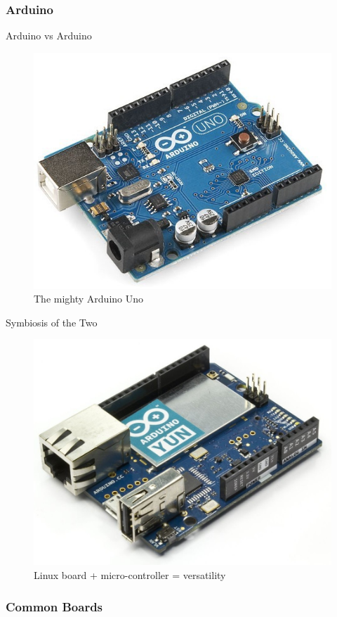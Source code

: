 \documentclass[hyperref={unicode}]{beamer}
\begin{document}
\subsubsection{Arduino}

\begin{frame}{Arduino vs Arduino}
	\begin{figure}
	\includegraphics[width=.7\textwidth]{arduino-uno.jpg}
	\caption{The mighty Arduino Uno}
	\end{figure}
\end{frame}

\begin{frame}{Symbiosis of the Two}
	\begin{figure}
	\includegraphics[width=.7\textwidth]{arduino-yun.jpg}
	\caption{Linux board + micro-controller = versatility}
	\end{figure}
\end{frame}


\subsubsection{Common Boards}
\end{document}
